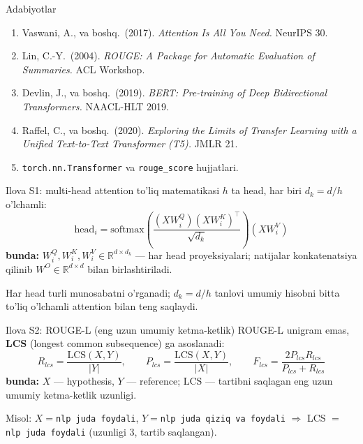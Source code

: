 \documentclass[aspectratio=169,11pt]{beamer}
\newcommand{\bunda}[1]{{\small\textbf{bunda:}\; #1}}
\begin{document}
\begin{frame}{Adabiyotlar}
  \begin{enumerate}\small\setlength\itemsep{5pt}
    \item Vaswani, A., va boshq.\ (2017). \textit{Attention Is All You Need.} NeurIPS 30.
    \item Lin, C.-Y.\ (2004). \textit{ROUGE: A Package for Automatic Evaluation
          of Summaries.} ACL Workshop.
    \item Devlin, J., va boshq.\ (2019). \textit{BERT: Pre-training of Deep
          Bidirectional Transformers.} NAACL-HLT 2019.
    \item Raffel, C., va boshq.\ (2020). \textit{Exploring the Limits of Transfer
          Learning with a Unified Text-to-Text Transformer (T5).} JMLR 21.
    \item \texttt{torch.nn.Transformer} va \texttt{rouge\_score} hujjatlari.
  \end{enumerate}
\end{frame}

\appendix

\begin{frame}{Ilova S1: multi-head attention to'liq matematikasi}
  \small
  $h$ ta head, har biri $d_k=d/h$ o'lchamli:
  $$ \mathrm{head}_i = \mathrm{softmax}\!\left(\frac{(XW_i^Q)(XW_i^K)^{\top}}{\sqrt{d_k}}\right)(XW_i^V) $$
  \bunda{$W_i^Q, W_i^K, W_i^V \in \mathbb{R}^{d\times d_k}$ --- har head
  proyeksiyalari; natijalar konkatenatsiya qilinib $W^O \in \mathbb{R}^{d\times d}$
  bilan birlashtiriladi.}
  \vspace{4pt}

  Har head turli munosabatni o'rganadi; $d_k=d/h$ tanlovi umumiy hisobni bitta
  to'liq o'lchamli attention bilan teng saqlaydi.
\end{frame}

\begin{frame}{Ilova S2: ROUGE-L (eng uzun umumiy ketma-ketlik)}
  \small
  ROUGE-L unigram emas, \textbf{LCS} (longest common subsequence) ga asoslanadi:
  $$ R_{lcs} = \frac{\mathrm{LCS}(X,Y)}{|Y|}, \qquad
     P_{lcs} = \frac{\mathrm{LCS}(X,Y)}{|X|}, \qquad
     F_{lcs} = \frac{2 P_{lcs} R_{lcs}}{P_{lcs}+R_{lcs}} $$
  \bunda{$X$ --- hypothesis, $Y$ --- reference; $\mathrm{LCS}$ --- tartibni
  saqlagan eng uzun umumiy ketma-ketlik uzunligi.}
  \vspace{4pt}

  Misol: $X=$\texttt{nlp juda foydali}, $Y=$\texttt{nlp juda qiziq va foydali}
  $\Rightarrow$ LCS $=$ \texttt{nlp juda foydali} (uzunligi 3, tartib saqlangan).
\end{frame}
\end{document}
